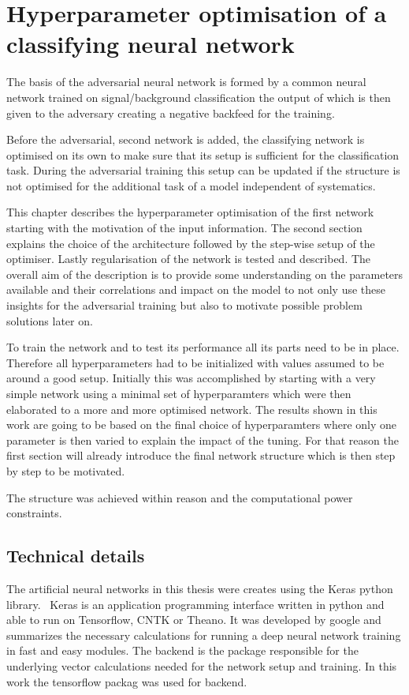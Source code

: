 \chapter{Hyperparameter optimisation of a classifying neural network}
\label{chp:simpleNN}

The basis of the adversarial neural network is formed by a common neural network trained on signal/background classification the output of which is then given to the adversary creating a negative backfeed for the training.

Before the adversarial, second network is added, the classifying network is optimised on its own to make sure that its setup is sufficient for the classification task.
During the adversarial training this setup can be updated if the structure is not optimised for the additional task of a model independent of systematics.

This chapter describes the hyperparameter optimisation of the first network starting with the motivation  of the input information.
The second section explains the choice of the architecture followed by the step-wise setup of the optimiser.
Lastly regularisation of the network is tested and described.
The overall aim of the description is to provide some understanding on the parameters available and their correlations and impact on the model to not only use these insights for the adversarial training but also to motivate possible problem solutions later on.


To train the network and to test its performance all its parts need to be in place. Therefore all hyperparameters had to be initialized with values assumed to be around a good setup. Initially this was accomplished by starting with a very simple network using a minimal set of hyperparamters which were then elaborated to a more and more optimised network. The results shown in this work are going to be based on the final choice of hyperparamters where only one parameter is then varied to explain the impact of the tuning. For that reason the first section will already introduce the final network structure which is then step by step to be motivated.

The structure was achieved within reason and the computational power constraints.


\section{Technical details}

The artificial neural networks in this thesis were creates using the Keras python library.~\cite{chollet2015keras} 
Keras is an application programming interface written in python and able to run on Tensorflow, CNTK or Theano. It was developed by google and summarizes the necessary calculations for running a deep neural network training in fast and easy modules.
The backend is the package responsible for the underlying vector calculations needed for the network setup and training. In this work the tensorflow packag was used for backend.~\cite{tensorflow2015-whitepaper}

